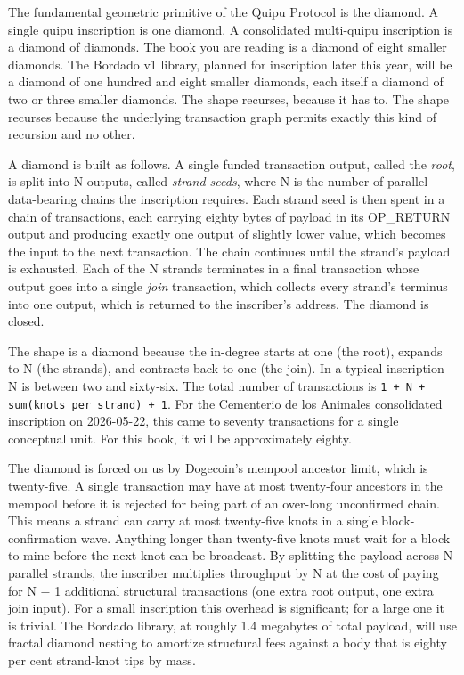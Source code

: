 \documentclass[11pt,openany]{book}
\begin{document}
The fundamental geometric primitive of the Quipu Protocol is the diamond. A single quipu inscription is one diamond. A consolidated multi-quipu inscription is a diamond of diamonds. The book you are reading is a diamond of eight smaller diamonds. The Bordado v1 library, planned for inscription later this year, will be a diamond of one hundred and eight smaller diamonds, each itself a diamond of two or three smaller diamonds. The shape recurses, because it has to. The shape recurses because the underlying transaction graph permits exactly this kind of recursion and no other.

A diamond is built as follows. A single funded transaction output, called the \emph{root}, is split into N outputs, called \emph{strand seeds}, where N is the number of parallel data-bearing chains the inscription requires. Each strand seed is then spent in a chain of transactions, each carrying eighty bytes of payload in its OP\_RETURN output and producing exactly one output of slightly lower value, which becomes the input to the next transaction. The chain continues until the strand's payload is exhausted. Each of the N strands terminates in a final transaction whose output goes into a single \emph{join} transaction, which collects every strand's terminus into one output, which is returned to the inscriber's address. The diamond is closed.

The shape is a diamond because the in-degree starts at one (the root), expands to N (the strands), and contracts back to one (the join). In a typical inscription N is between two and sixty-six. The total number of transactions is \texttt{1 + N + sum(knots\_per\_strand) + 1}. For the Cementerio de los Animales consolidated inscription on 2026-05-22, this came to seventy transactions for a single conceptual unit. For this book, it will be approximately eighty.

The diamond is forced on us by Dogecoin's mempool ancestor limit, which is twenty-five. A single transaction may have at most twenty-four ancestors in the mempool before it is rejected for being part of an over-long unconfirmed chain. This means a strand can carry at most twenty-five knots in a single block-confirmation wave. Anything longer than twenty-five knots must wait for a block to mine before the next knot can be broadcast. By splitting the payload across N parallel strands, the inscriber multiplies throughput by N at the cost of paying for N − 1 additional structural transactions (one extra root output, one extra join input). For a small inscription this overhead is significant; for a large one it is trivial. The Bordado library, at roughly 1.4 megabytes of total payload, will use fractal diamond nesting to amortize structural fees against a body that is eighty per cent strand-knot tips by mass.
\end{document}
